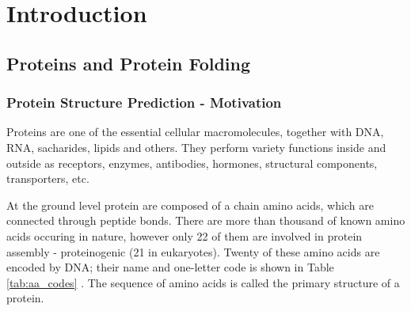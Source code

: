 \chapter{Introduction}

\section{Proteins and Protein Folding}

\subsection{Protein Structure Prediction - Motivation}
    
    
Proteins are one of the essential cellular macromolecules, together with DNA, RNA, sacharides, lipids and others.
They perform variety functions inside and outside as receptors, enzymes, antibodies, hormones, structural components, transporters, etc. 

At the ground level protein are composed of a chain amino acids, which are connected through peptide bonds. There are more than thousand of known amino acids occuring in nature, however only 22 of them are involved in protein assembly - proteinogenic (21 in eukaryotes). Twenty of these amino acids are encoded by DNA; their name and one-letter code is shown in Table \ref{tab:aa_codes} \cite{protgenaa}. The sequence of amino acids is called the primary structure of a protein.


